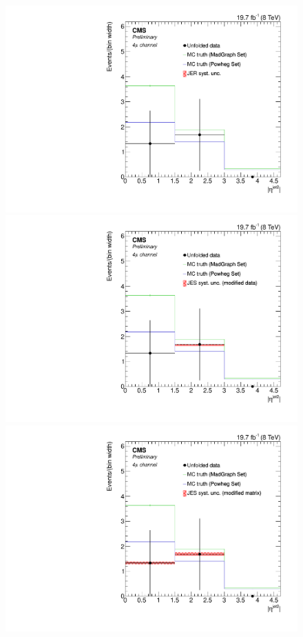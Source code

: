 \begin{figure}[hbtp]
\begin{center}
   \includegraphics[width=0.8\cmsFigWidth]{Figures/Unfolding/Systematics/ZZTo4m_EtaJet2_JER_Mad_fr}
   \includegraphics[width=0.8\cmsFigWidth]{Figures/Unfolding/Systematics/ZZTo4m_EtaJet2_JES_ModData_Mad_fr}     
   \includegraphics[width=0.8\cmsFigWidth]{Figures/Unfolding/Systematics/ZZTo4m_EtaJet2_JES_ModMat_Mad_fr}

\end{center}
\end{figure}

